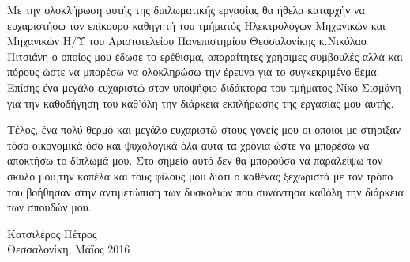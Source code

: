 
\cleardoublepage


\begin{acknowledgements}

\par Με την ολοκλήρωση αυτής της διπλωματικής εργασίας θα ήθελα καταρχήν να ευχαριστήσω τον επίκουρο καθηγητή του τμήματός Ηλεκτρολόγων Μηχανικών και Μηχανικών Η/Υ του Αριστοτελείου Πανεπιστημίου Θεσσαλονίκης κ.Νικόλαο Πιτσιάνη ο οποίος μου έδωσε το ερέθισμα, απαραίτητες χρήσιμες συμβουλές αλλά και πόρους ώστε να μπορέσω να ολοκληρώσω την έρευνα για το συγκεκριμένο θέμα. Επίσης ένα μεγάλο ευχαριστώ στον υποψήφιο διδάκτορα του τμήματος Νίκο Σισμάνη για την καθοδήγηση του καθ'όλη την διάρκεια εκπλήρωσης της εργασίας μου αυτής. 

\par Τέλος, ένα πολύ θερμό και μεγάλο ευχαριστώ στους γονείς μου οι οποίοι με στήριξαν τόσο οικονομικά όσο και ψυχολογικά όλα αυτά τα χρόνια ώστε να μπορέσω να αποκτήσω το δίπλωμά μου. Στο σημείο αυτό δεν θα μπορούσα να παραλείψω τον σκύλο μου,την κοπέλα και τους φίλους μου διότι ο καθένας ξεχωριστά με τον τρόπο του βοήθησαν στην αντιμετώπιση των δυσκολιών που συνάντησα καθόλη την διάρκεια των σπουδών μου.

\begin{flushright}
Κατσιλέρος Πέτρος \\
Θεσσαλονίκη, Μάϊος 2016
\end{flushright}

\end{acknowledgements}
